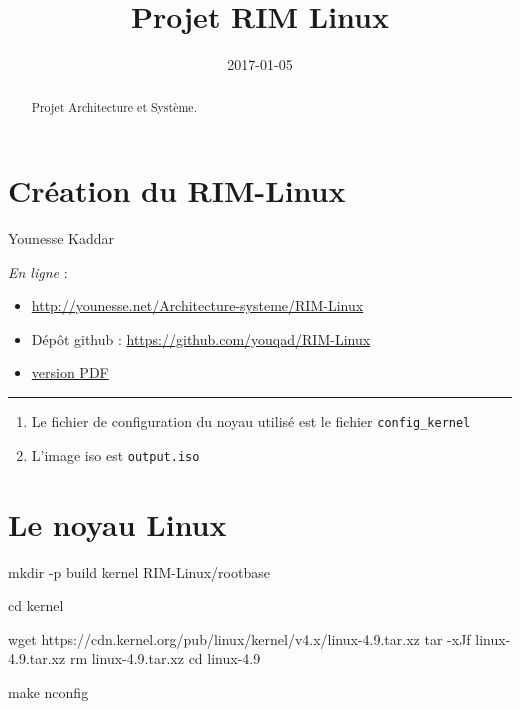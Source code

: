 \documentclass[]{article}
\title{Projet RIM Linux}
\date{2017-01-05}
\newenvironment{Shaded}{}{}
\newcommand{\FunctionTok}[1]{\textcolor[rgb]{0.02,0.16,0.49}{{#1}}}
\newcommand{\BuiltInTok}[1]{{#1}}
\newcommand{\NormalTok}[1]{{#1}}
\begin{document}
\maketitle
\begin{abstract}
Projet Architecture et Système.
\end{abstract}

\section{Création du RIM-Linux}\label{cruxe9ation-du-rim-linux}

Younesse Kaddar

\emph{En ligne} :

\begin{itemize}
\item
  \url{http://younesse.net/Architecture-systeme/RIM-Linux}
\item
  Dépôt github : \url{https://github.com/youqad/RIM-Linux}
\item
  \href{/assets/ArchiSysteme/RIM-Linux.pdf}{version PDF}
\end{itemize}

\begin{center}\rule{0.5\linewidth}{\linethickness}\end{center}

\begin{enumerate}
\def\labelenumi{\arabic{enumi}.}
\item
  Le fichier de configuration du noyau utilisé est le fichier
  \texttt{config\_kernel}
\item
  L'image iso est \texttt{output.iso}
\end{enumerate}

\section{Le noyau Linux}\label{le-noyau-linux}

\begin{Shaded}
\begin{Highlighting}[]
\FunctionTok{mkdir} \NormalTok{-p build kernel RIM-Linux/rootbase}

\BuiltInTok{cd} \NormalTok{kernel}

\FunctionTok{wget} \NormalTok{https://cdn.kernel.org/pub/linux/kernel/v4.x/linux-4.9.tar.xz}
\FunctionTok{tar} \NormalTok{-xJf linux-4.9.tar.xz}
\FunctionTok{rm} \NormalTok{linux-4.9.tar.xz}
\BuiltInTok{cd} \NormalTok{linux-4.9}

\FunctionTok{make} \NormalTok{nconfig}
\end{Highlighting}
\end{Shaded}
\end{document}
